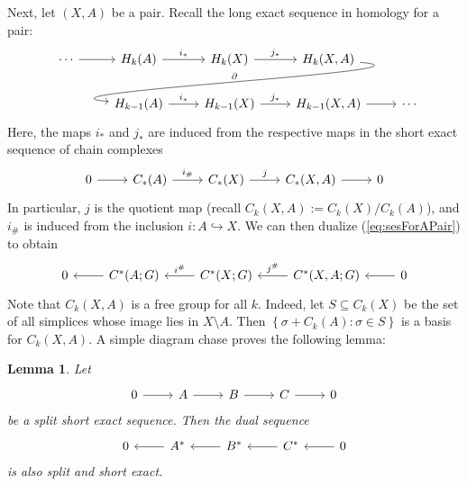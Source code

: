\documentclass{book}
\newcommand{\set}[1]{\left\{ {#1} \right\}}
\newtheorem{lemma}[theorem]{Lemma}
\theoremstyle{definition}
\theoremstyle{remark}
\numberwithin{equation}{section}
\begin{document}
Next, let $(X,A)$ be a pair. Recall the long exact sequence in homology for a pair:
\begin{equation} \begin{tikzcd}
    \cdots \arrow[r] & H_k(A)     \arrow[r, "i_*"] & H_k(X)     \arrow[r, "j_*"] & H_k(X,A)     \arrow[dll, out=355, in=175, "\partial" above] &        \\
                     & H_{k-1}(A) \arrow[r, "i_*"] & H_{k-1}(X) \arrow[r, "j_*"] & H_{k-1}(X,A) \arrow[r]                                      & \cdots 
\end{tikzcd} \end{equation}
Here, the maps $i_*$ and $j_*$ are induced from the respective maps in the short exact sequence of chain complexes 
\begin{equation} \begin{tikzcd} \label{eq:sesForAPair}
    0 \arrow[r] & C_*(A) \arrow[r,"i_\#"] & C_*(X) \arrow[r,"j"] & C_*(X,A) \arrow[r] & 0
\end{tikzcd} \end{equation}
In particular, $j$ is the quotient map (recall $C_k(X,A) := C_k(X)/C_k(A)$), and $i_\#$ is induced from the inclusion $i \colon A \hookrightarrow X$. We can then dualize (\ref{eq:sesForAPair}) to obtain 
\begin{equation} \begin{tikzcd} \label{eq:dualsesForAPair}
    0 & C^*(A;G) \arrow[l]  & C^*(X;G) \arrow[l,"i^\#" above] & C^*(X,A;G) \arrow[l,"j^\#" above] & 0 \arrow[l]
\end{tikzcd} \end{equation}
Note that $C_k(X,A)$ is a free group for all $k$. Indeed, let $S \subseteq C_k(X)$ be the set of all simplices whose image lies in $X \setminus A$. Then $\set{\sigma + C_k(A) : \sigma \in S}$ is a basis for $C_k(X,A)$. A simple diagram chase proves the following lemma:
\begin{lemma}
    Let 
    \begin{equation} \begin{tikzcd}
        0 \arrow[r] & A \arrow[r] & B \arrow[r] & C \arrow[r] & 0
    \end{tikzcd} \end{equation}
    be a split short exact sequence. Then the dual sequence 
    \begin{equation} \begin{tikzcd}
        0 & A^* \arrow[l] & B^* \arrow[l] & C^* \arrow[l] & 0 \arrow[l]
    \end{tikzcd} \end{equation}
    is also split and short exact.
\end{lemma}
\end{document}
